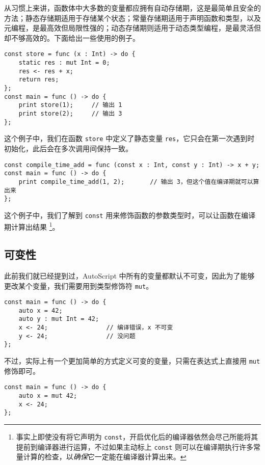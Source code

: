 从习惯上来讲，函数体中大多数的变量都应拥有自动存储期，这是最简单且安全的方法；静态存储期适用于存储某个状态；常量存储期适用于声明函数和类型，以及元编程，是最高效但局限性强的；动态存储期则适用于动态类型编程，是最灵活但却不够高效的。下面给出一些使用的例子。

\begin{lstlisting}
const store = func (x : Int) -> do {
    static res : mut Int = 0;
    res <- res + x;
    return res;
};
const main = func () -> do {
    print store(1);     // 输出 1
    print store(2);     // 输出 3
};
\end{lstlisting}

这个例子中，我们在函数 \lstinline!store! 中定义了静态变量 \lstinline!res!，它只会在第一次遇到时初始化，此后会在多次调用间保持一致。

\begin{lstlisting}
const compile_time_add = func (const x : Int, const y : Int) -> x + y;
const main = func () -> do {
    print compile_time_add(1, 2);       // 输出 3，但这个值在编译期就可以算出来
};
\end{lstlisting}

这个例子中，我们了解到 \lstinline!const! 用来修饰函数的参数类型时，可以让函数在编译期计算出结果 \footnote{事实上即使没有将它声明为 \lstinline!const!，开启优化后的编译器依然会尽己所能将其提前到编译器进行运算，不过如果主动标上 \lstinline!const! 则可以在编译期执行许多常量计算的检查，以\emph{确保}它一定能在编译器计算出来。}。

\subsection{可变性}

此前我们就已经提到过，AutoScript 中所有的变量都默认不可变，因此为了能够更改某个变量，我们需要用到类型修饰符 \lstinline!mut!。

\begin{lstlisting}
const main = func () -> do {
    auto x = 42;
    auto y : mut Int = 42;
    x <- 24;                // 编译错误，x 不可变
    y <- 24;                // 没问题
};
\end{lstlisting}

不过，实际上有一个更加简单的方式定义可变的变量，只需在表达式上直接用 \lstinline!mut! 修饰即可。

\begin{lstlisting}
const main = func () -> do {
    auto x = mut 42;
    x <- 24;
};
\end{lstlisting}

